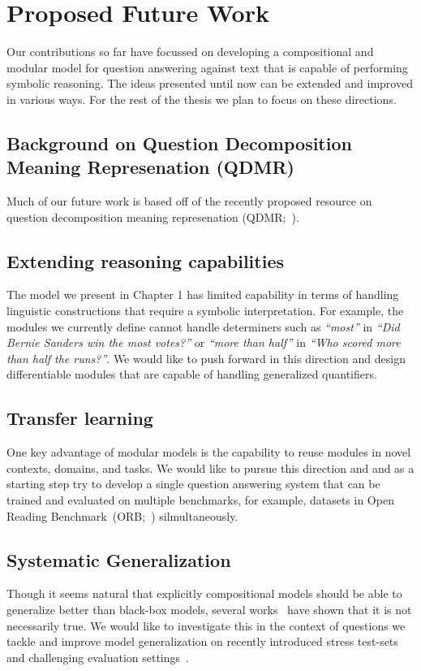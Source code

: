 \documentclass[main.tex]{subfiles}
\begin{document}
\section{Proposed Future Work} %
\label{sec:future}

Our contributions so far have focussed on developing a compositional and modular model for question answering against text that is capable of performing symbolic reasoning. The ideas presented until now can be extended and improved in various ways. For the rest of the thesis we plan to focus on these directions.

\subsection{Background on Question Decomposition Meaning Represenation (QDMR)}
Much of our future work is based off of the recently proposed resource on question decomposition meaning represenation (QDMR;~). 

\subsection{Extending reasoning capabilities}
The model we present in Chapter 1 has limited capability in terms of handling linguistic constructions that require a symbolic interpretation.  For example, the modules we currently define cannot handle determiners such as \textit{``most''} in \textit{``Did Bernie Sanders win the most votes?''} or \textit{``more than half''} in \textit{``Who scored more than half the runs?''}. We would like to push forward in this direction and design differentiable modules that are capable of handling generalized quantifiers.

\subsection{Transfer learning}
One key advantage of modular models is the capability to reuse modules in novel contexts, domains, and tasks. We would like to pursue this direction and and as a starting step try to develop a single question answering system that can be trained and evaluated on multiple benchmarks, for example, datasets in Open Reading Benchmark~(ORB;~) silmultaneously.

\subsection{Systematic Generalization}
Though it seems natural that explicitly compositional models should be able to generalize better than black-box models, several works~\cite{sys-generalization-2018,closure-generalization-2020} have shown that it is not necessarily true. We would like to investigate this in the context of questions we tackle and improve model generalization on recently introduced stress test-sets~\cite{contrast-sets-2020} and challenging evaluation settings~\cite{text2sql-2018}.
\end{document}
